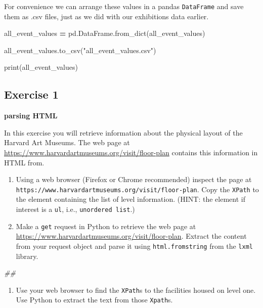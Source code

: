 \documentclass[
]{book}
\newenvironment{Shaded}{\begin{snugshade}}{\end{snugshade}}
\newcommand{\BuiltInTok}[1]{#1}
\newcommand{\CommentTok}[1]{\textcolor[rgb]{0.56,0.35,0.01}{\textit{#1}}}
\newcommand{\NormalTok}[1]{#1}
\newcommand{\OperatorTok}[1]{\textcolor[rgb]{0.81,0.36,0.00}{\textbf{#1}}}
\newcommand{\StringTok}[1]{\textcolor[rgb]{0.31,0.60,0.02}{#1}}
\providecommand{\tightlist}{%
  \setlength{\itemsep}{0pt}\setlength{\parskip}{0pt}}
\begin{document}
For convenience we can arrange these values in a pandas \texttt{DataFrame}
and save them as .csv files, just as we did with our exhibitions data earlier.

\begin{Shaded}
\begin{Highlighting}[]
\NormalTok{all_event_values }\OperatorTok{=}\NormalTok{ pd.DataFrame.from_dict(all_event_values)}

\NormalTok{all_event_values.to_csv(}\StringTok{"all_event_values.csv"}\NormalTok{)}

\BuiltInTok{print}\NormalTok{(all_event_values)}
\end{Highlighting}
\end{Shaded}

\hypertarget{exercise-1-5}{%
\subsection{Exercise 1}\label{exercise-1-5}}

\textbf{parsing HTML}

In this exercise you will retrieve information about the physical
layout of the Harvard Art Museums. The web page at
\url{https://www.harvardartmuseums.org/visit/floor-plan} contains this
information in HTML from.

\begin{enumerate}
\def\labelenumi{\arabic{enumi}.}
\item
  Using a web browser (Firefox or Chrome recommended) inspect the
  page at \texttt{https://www.harvardartmuseums.org/visit/floor-plan}. Copy
  the \texttt{XPath} to the element containing the list of level
  information. (HINT: the element if interest is a \texttt{ul}, i.e.,
  \texttt{unordered\ list}.)
\item
  Make a \texttt{get} request in Python to retrieve the web page at
  \url{https://www.harvardartmuseums.org/visit/floor-plan}. Extract the
  content from your request object and parse it using \texttt{html.fromstring}
  from the \texttt{lxml} library.
\end{enumerate}

\begin{Shaded}
\begin{Highlighting}[]
\CommentTok{##}
\end{Highlighting}
\end{Shaded}

\begin{enumerate}
\def\labelenumi{\arabic{enumi}.}
\setcounter{enumi}{2}
\tightlist
\item
  Use your web browser to find the \texttt{XPath}s to the facilities housed on
  level one. Use Python to extract the text from those \texttt{Xpath}s.
\end{enumerate}
\end{document}
